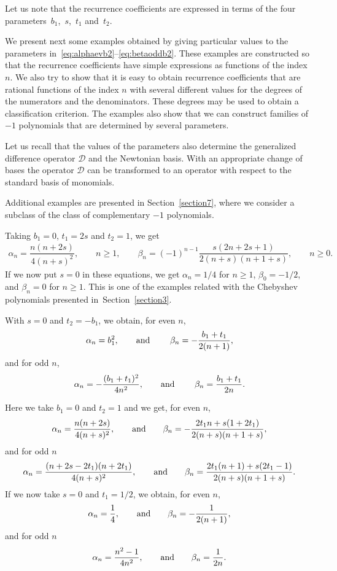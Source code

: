 \documentclass[10pt,a4paper]{amsart}
\def\cD{\mathcal D}
\numberwithin{equation}{section}
\begin{document}
Let us note that the recurrence coefficients are expressed in terms of the four parameters~$b_1$,~$s$,~$t_1$ and~$t_2$.

We present next some examples obtained by giving particular values to the parameters in~\eqref{eq:alphaevb2}--\eqref{eq:betaoddb2}.
These examples are constructed so that the recurrence coefficients have simple expressions as functions of the index $n$. We also try to show that it is easy to obtain recurrence coefficients that are rational functions of the index $n$ with several different values for the degrees of the numerators and the denominators. These degrees may be used to obtain a classification criterion. The examples also show that we can construct families of $-1$ polynomials that are determined by several parameters.

Let us recall that the values of the parameters also determine the generalized difference operator $\cD$ and the Newtonian basis. With an appropriate change of bases the operator $\cD$ can be transformed to an operator with respect to the standard basis of monomials.

Additional examples are presented in Section~\ref{section7}, where we consider a subclass of the class of complementary $-1$ polynomials.

\begin{Example}
Taking $b_1=0$, $t_1=2s$ and $t_2=1$, we get
\begin{gather*}%
\alpha_n=\dfrac{n(n+2s)}{4 (n+s)^2}, \qquad n\ge 1,
\qquad
	\beta_n=(-1)^{n-1}\dfrac{s(2 n + 2s+1)}{2 (n+s)(n+1+s)}, \qquad n\ge 0.
\end{gather*}
If we now put $s=0$ in these equations, we get $\alpha_n=1/4$ for $n\ge 1$, $\beta_0=-1/2$, and $\beta_n=0$ for $n\ge 1$. This is one of the examples related with the Chebyshev polynomials presented in~Section~\ref{section3}.
\end{Example}
\begin{Example}
With $s=0$ and $t_2=-b_1$, we obtain, for even $n$,
\[ \alpha_n=b_1^2, \qquad \hbox{and }\qquad \beta_n= -\dfrac{b_1+t_1}{2 (n+1)}, \]
and for odd $n$,
\[ \alpha_n=-\dfrac{(b_1+t_1)^2}{4 n^2}, \qquad \hbox{and } \qquad \beta_n=\dfrac{b_1+t_1}{2 n}. \]
\end{Example}
\begin{Example}
Here we take $b_1=0$ and $t_2=1$ and we get, for even $n$,
\[ \alpha_n=\dfrac{n ( n+2s)}{4(n+s)^2}, \qquad \hbox{and} \qquad \beta_n=-\dfrac{2 t_1 n + s(1+ 2 t_1)}{2(n+s)(n+1+s)}, \]
and for odd $n$
\[ \alpha_n=\dfrac{(n+2s-2t_1)(n+ 2 t_1)}{4(n+s)^2}, \qquad \hbox{and} \qquad \beta_n=
\dfrac{2 t_1( n+1) + s( 2 t_1-1)}{2(n+s)(n+1+s)}. \]
If we now take $s=0$ and $t_1=1/2$, we obtain, for even $n$,
\[ \alpha_n=\frac{1}{4}, \qquad \hbox{and} \qquad \beta_n=-\dfrac{1}{2 (n+1)}, \]
and for odd $n$
\[ \alpha_n=\dfrac{n^2-1}{4 n^2}, \qquad \hbox{and} \qquad \beta_n=\dfrac{1}{2 n}. \]
\end{Example}
\end{document}
